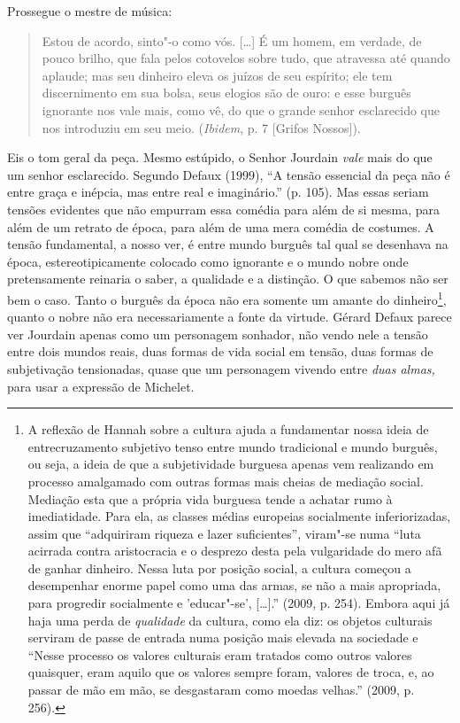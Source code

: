Prossegue o mestre de música:

\begin{quote}
Estou de acordo, sinto"-o como vós. [\ldots{}] É um homem, em
verdade, de pouco brilho, que fala pelos cotovelos sobre tudo, que
atravessa até quando aplaude; mas seu dinheiro eleva os juízos de seu
espírito; ele tem discernimento em sua bolsa, seus elogios são de ouro:
e esse burguês ignorante nos vale mais, como vê, do que o grande senhor
esclarecido que nos introduziu em seu meio. (\emph{Ibidem}, p. 7
[Grifos Nossos]).
\end{quote}

Eis o tom geral da peça. Mesmo estúpido, o Senhor Jourdain \emph{vale}
mais do que um senhor esclarecido. Segundo Defaux (1999), ``A tensão
essencial da peça não é entre graça e inépcia, mas entre real e
imaginário.'' (p. 105). Mas essas seriam tensões evidentes que não
empurram essa comédia para além de si mesma, para além de um retrato de
época, para além de uma mera comédia de costumes. A tensão fundamental,
a nosso ver, é entre mundo burguês tal qual se desenhava na época,
estereotipicamente colocado como ignorante e o mundo nobre onde
pretensamente reinaria o saber, a qualidade e a distinção. O que sabemos
não ser bem o caso. Tanto o burguês da época não era somente um amante
do dinheiro\footnote{A reflexão de Hannah sobre a cultura ajuda a
  fundamentar nossa ideia de entrecruzamento subjetivo tenso entre mundo
  tradicional e mundo burguês, ou seja, a ideia de que a subjetividade
  burguesa apenas vem realizando em processo amalgamado com outras
  formas mais cheias de mediação social. Mediação esta que a própria
  vida burguesa tende a achatar rumo à imediatidade. Para ela, as
  classes médias europeias socialmente inferiorizadas, assim que
  ``adquiriram riqueza e lazer suficientes'', viram"-se numa ``luta
  acirrada contra aristocracia e o desprezo desta pela vulgaridade do
  mero afã de ganhar dinheiro. Nessa luta por posição social, a cultura
  começou a desempenhar enorme papel como uma das armas, se não a mais
  apropriada, para progredir socialmente e 'educar"-se',
  [\ldots{}].'' (2009, p. 254). Embora aqui já haja uma perda de
  \emph{qualidade} da cultura, como ela diz: os objetos culturais
  serviram de passe de entrada numa posição mais elevada na sociedade e
  ``Nesse processo os valores culturais eram tratados como outros
  valores quaisquer, eram aquilo que os valores sempre foram, valores de
  troca, e, ao passar de mão em mão, se desgastaram como moedas
  velhas.'' (2009, p. 256).}, quanto o nobre não era necessariamente a
fonte da virtude. Gérard Defaux parece ver Jourdain apenas como um
personagem sonhador, não vendo nele a tensão entre dois mundos reais,
duas formas de vida social em tensão, duas formas de subjetivação
tensionadas, quase que um personagem vivendo entre \emph{duas almas,}
para usar a expressão de Michelet.

